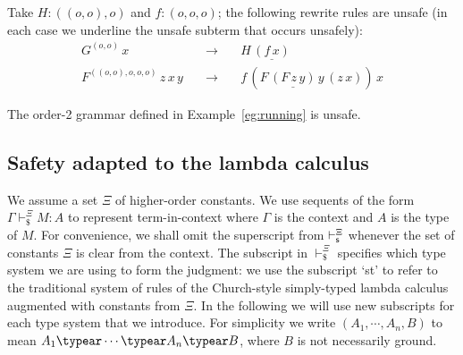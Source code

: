\begin{example}\begin{inparaenum}[(i)] \item Take $H : ((o, o), o)$ and $f : (o, o, o)$; the
    following rewrite rules are unsafe (in each case we underline the
    unsafe subterm that occurs unsafely):
\[\begin{array}{rll}
G^{(o, o)} \, x & \quad \rightarrow \quad & H \, \underline{(f \, {x})} \\
F^{((o, o), o, o, o)} \, z \, x \, y & \quad \rightarrow \quad & f \, (F \, \underline{(F \, z
\, {y})} \, y \, (z \, x) ) \, x
\end{array}\]
\item The order-2 grammar defined in Example~\ref{eg:running} is
  unsafe.
\end{inparaenum}
\end{example}

\subsection*{Safety adapted to the lambda calculus}
We assume a set $\Xi$ of higher-order constants. We use sequents of
the form $\Gamma \vdash_\$^\Xi M : A$ to represent term-in-context
where $\Gamma$ is the context and $A$ is the type of $M$. For
convenience, we shall omit the superscript from $\vdash_{\sf s}^\Xi$
whenever the set of constants $\Xi$ is clear from the context. The
subscript in $\vdash_\$^\Xi$ specifies which type system we are
using to form the judgment: we use the subscript `st' to refer to
the traditional system of rules of the Church-style simply-typed
lambda calculus augmented with constants from $\Xi$. In the
following we will use new subscripts for each type system that we
introduce. For simplicity we write $(A_1, \cdots, A_n, B)$ to mean
$A_1 \typear \cdots \typear A_n \typear B$, where $B$ is not
necessarily ground.

